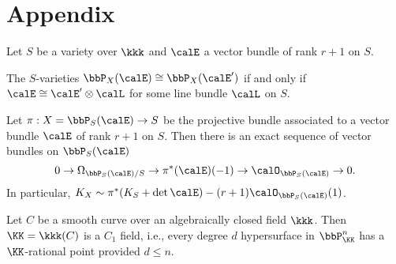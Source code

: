 \section{Appendix}

    Let \(S\) be a variety over \(\kkk\) and \(\calE\) a vector bundle of rank \(r+1\) on \(S\).

    \begin{proposition}\label{prop:isomorphic_projective_bundle_iff_twist_by_line_bundle}
        The \(S\)-varieties \(\bbP_X(\calE) \cong \bbP_X(\calE')\) if and only if \(\calE \cong \calE' \otimes \calL\) for some line bundle \(\calL\) on \(S\).
    \end{proposition}

    \begin{theorem}\label{thm:Eulur_sequence_for_projective_bundle}
        Let \(\pi: X=\bbP_S(\calE) \to S\) be the projective bundle associated to a vector bundle \(\calE\) of rank \(r+1\) on \(S\). 
        Then there is an exact sequence of vector bundles on \(\bbP_S(\calE)\)
        \[
            0 \to \Omega_{\bbP_S(\calE)/S} \to \pi^*(\calE)(-1) \to \calO_{\bbP_S(\calE)} \to 0.
        \]
        In particular, \(K_X \sim \pi^*(K_S + \det \calE) - (r+1)\calO_{\bbP_S(\calE)}(1)\).
    \end{theorem}

    \begin{theorem}\label{thm:Tsen_theorem}
        Let \(C\) be a smooth curve over an algebraically closed field \(\kkk\). 
        Then \(\KK=\kkk(C)\) is a \(C_1\) field, i.e., every degree \(d\) hypersurface in \(\bbP^n_{\KK}\) has a \(\KK\)-rational point provided \(d \leq n\).
    \end{theorem}


